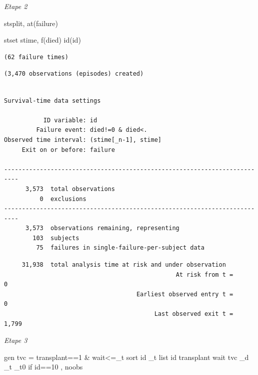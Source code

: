 \documentclass[
  12pt,
  letterpaper,
  DIV=11,
  numbers=noendperiod,
  onepage,
  openany]{scrreprt}
\newenvironment{Shaded}{\begin{snugshade}}{\end{snugshade}}
\newcommand{\FunctionTok}[1]{\textcolor[rgb]{0.94,0.94,0.56}{#1}}
\newcommand{\KeywordTok}[1]{\textcolor[rgb]{0.94,0.87,0.69}{#1}}
\newcommand{\NormalTok}[1]{\textcolor[rgb]{0.80,0.80,0.80}{#1}}
\newcommand{\OtherTok}[1]{\textcolor[rgb]{0.94,0.94,0.56}{#1}}
\begin{document}
\emph{Etape 2}

\begin{Shaded}
\begin{Highlighting}[]
\KeywordTok{stsplit}\NormalTok{, }\FunctionTok{at}\NormalTok{(failure)}

\KeywordTok{stset}\NormalTok{ stime, f(died) id(id)}
\end{Highlighting}
\end{Shaded}

\begin{verbatim}
(62 failure times)
\end{verbatim}

\begin{verbatim}
(3,470 observations (episodes) created)
\end{verbatim}

\begin{verbatim}

Survival-time data settings

           ID variable: id
         Failure event: died!=0 & died<.
Observed time interval: (stime[_n-1], stime]
     Exit on or before: failure

--------------------------------------------------------------------------
      3,573  total observations
          0  exclusions
--------------------------------------------------------------------------
      3,573  observations remaining, representing
        103  subjects
         75  failures in single-failure-per-subject data
\end{verbatim}

\begin{verbatim}
     31,938  total analysis time at risk and under observation
                                                At risk from t =         0
                                     Earliest observed entry t =         0
                                          Last observed exit t =     1,799
\end{verbatim}

\emph{Etape 3}

\begin{Shaded}
\begin{Highlighting}[]
\KeywordTok{gen}\NormalTok{ tvc = transplant==1 \& wait\textless{}=\_t}
\KeywordTok{sort}\NormalTok{ id \_t}
\OtherTok{list}\NormalTok{ id transplant wait tvc \_d \_t \_t0 }\KeywordTok{if}\NormalTok{ id==10  , }\KeywordTok{noobs}
\end{Highlighting}
\end{Shaded}
\end{document}
